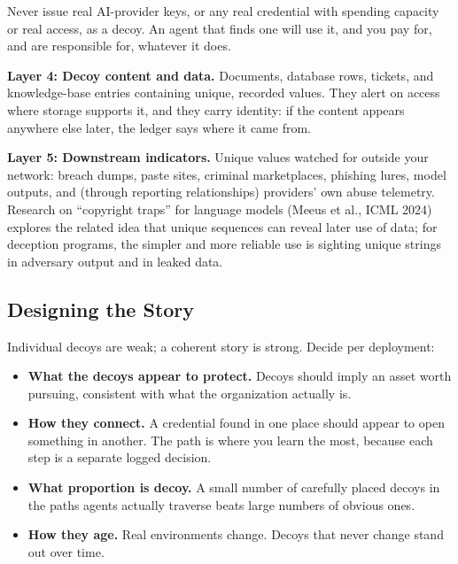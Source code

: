\documentclass[11pt,letterpaper]{article}
\begin{document}
\begin{warnbox}
Never issue real AI-provider keys, or any real credential with spending capacity or real access, as a decoy. An agent that finds one will use it, and you pay for, and are responsible for, whatever it does.
\end{warnbox}

\textbf{\textcolor{deepindigo}{Layer 4: Decoy content and data.}} Documents, database rows, tickets, and knowledge-base entries containing unique, recorded values. They alert on access where storage supports it, and they carry identity: if the content appears anywhere else later, the ledger says where it came from.

\textbf{\textcolor{deepindigo}{Layer 5: Downstream indicators.}} Unique values watched for outside your network: breach dumps, paste sites, criminal marketplaces, phishing lures, model outputs, and (through reporting relationships) providers' own abuse telemetry. Research on ``copyright traps'' for language models (Meeus et al., ICML 2024) explores the related idea that unique sequences can reveal later use of data; for deception programs, the simpler and more reliable use is sighting unique strings in adversary output and in leaked data.

\subsection{Designing the Story}
\label{sec:story}

Individual decoys are weak; a coherent story is strong. Decide per deployment:

\begin{itemize}
  \item \textbf{What the decoys appear to protect.} Decoys should imply an asset worth pursuing, consistent with what the organization actually is.
  \item \textbf{How they connect.} A credential found in one place should appear to open something in another. The path is where you learn the most, because each step is a separate logged decision.
  \item \textbf{What proportion is decoy.} A small number of carefully placed decoys in the paths agents actually traverse beats large numbers of obvious ones.
  \item \textbf{How they age.} Real environments change. Decoys that never change stand out over time.
\end{itemize}
\end{document}
